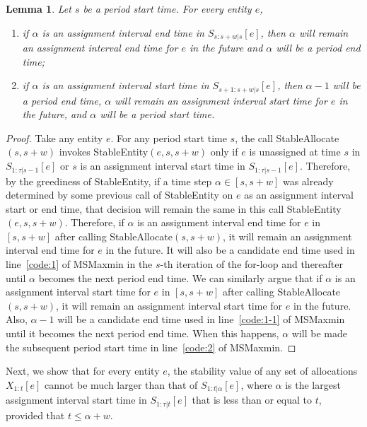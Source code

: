 \documentclass[11pt,a4paper]{article}
\renewcommand{\leq}{\leqslant}
\newtheorem{lemma}[theorem]{\bfseries{Lemma}}
\begin{document}
\begin{lemma}
	\label{lem:period}
	Let $s$ be a period start time.  For every entity $e$,
	\begin{enumerate}[{\em (i)}]
		
		\item  if $\alpha$ is an assignment interval end time in $S_{s:s+w|s}[e]$, then $\alpha$ will remain an assignment interval end time for $e$ in the future and $\alpha$ will be a period end time; 
		
		\item if $\alpha$ is an assignment interval start time in $S_{s+1:s+w|s}[e]$, then $\alpha-1$ will be a period end time,  $\alpha$ will remain an assignment interval start time for $e$ in the future, and $\alpha$ will be a period start time.
		
	\end{enumerate}
\end{lemma}
\begin{proof}
	Take any entity $e$.  For any period start time $s$, the call StableAllocate$(s,s+w)$ invokes StableEntity$(e,s,s+w)$ only if $e$ is unassigned at time $s$ in $S_{1:\tau|s-1}[e]$ or $s$ is an assignment interval start time in $S_{1:\tau|s-1}[e]$.  Therefore, by the greediness of StableEntity, if a time step $\alpha\in [s,s+w]$ was already determined by some previous call of StableEntity on $e$ as an assignment interval start or end time, that decision will remain the same in this call StableEntity$(e,s,s+w)$.  Therefore, if $\alpha$ is an assignment interval end time for $e$ in $[s,s+w]$ after calling StableAllocate$(s,s+w)$, it will remain an assignment interval end time for $e$ in the future.  It will also be a candidate end time used in line~\ref{code:1} of MSMaxmin in the $s$-th iteration of the for-loop and thereafter until $\alpha$ becomes the next period end time.  We can similarly argue that if $\alpha$ is an assignment interval start time for $e$ in $[s,s+w]$ after calling StableAllocate$(s,s+w)$, it will remain an assignment interval start time for $e$ in the future.  Also, $\alpha-1$ will be a candidate end time used in line~\ref{code:1-1} of MSMaxmin until it becomes the next period end time.  When this happens, $\alpha$ will be made the subsequent period start time in line~\ref{code:2} of MSMaxmin.
\end{proof}


Next, we show that for every entity $e$, the stability value of any set of allocations $X_{1:t}[e]$ cannot be much larger than that of $S_{1:t|\alpha}[e]$, where $\alpha$ is the largest assignment interval start time in $S_{1:\tau|t}[e]$ that is less than or equal to $t$, provided that $t \leq \alpha+w$.
\end{document}
